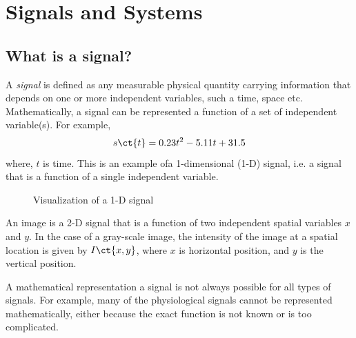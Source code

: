 
\chapter{Signals and Systems}


\section{What is a signal?}
A \textit{signal} is defined as any measurable physical quantity carrying information that depends on one or more independent variables, such a time, space etc. Mathematically, a signal can be represented a function of a set of independent variable(s). For example,
\[ s\ct{t} = 0.23t^2 - 5.11t + 31.5 \]
where, $t$ is time. This is an example ofa  1-dimensional (1-D) signal, i.e. a signal that is a function of a single independent variable. 

\begin{figure}[h]
\centering
\caption{Visualization of a 1-D signal} \label{fig:ch1_signal_1d}
\end{figure}

An image is a 2-D signal that is a function of two independent spatial variables $x$ and $y$. In the case of a gray-scale image, the intensity of the image at a spatial location is given by $I\ct{x, y}$, where $x$ is horizontal position, and $y$ is the vertical position.

A mathematical representation a signal is not always possible for all types of signals. For example, many of the physiological signals cannot be represented mathematically, either because the exact function is not known or is too complicated.

